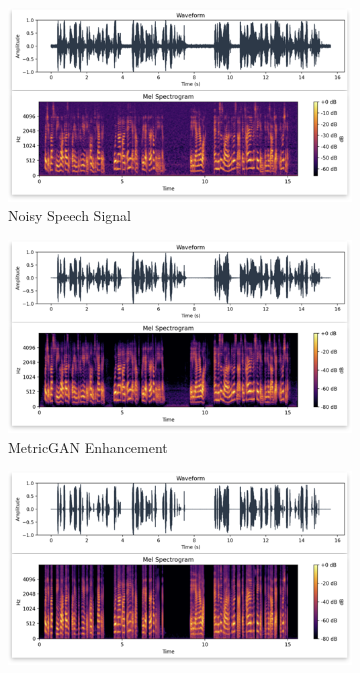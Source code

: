 \begin{figure}[H]
    \centering
         \begin{subfigure}[b]{0.3\textwidth}
             \centering
             \includegraphics[width=\textwidth]{figures/snr20_o.png}
             \caption{Noisy Speech Signal}
             \label{fig:y equals x}
         \end{subfigure}
         \hfill
         \begin{subfigure}[b]{0.3\textwidth}
             \centering
             \includegraphics[width=\textwidth]{figures/snr20_e.png}
             \caption{MetricGAN Enhancement}
             \label{fig:three sin x}
         \end{subfigure}
         \hfill
         \begin{subfigure}[b]{0.3\textwidth}
             \centering
             \includegraphics[width=\textwidth]{figures/snr20_w.png}

\end{subfigure}
\end{figure}
